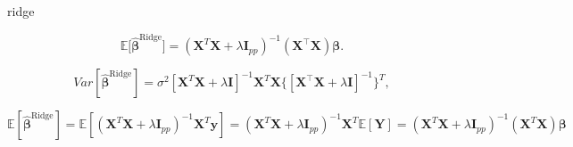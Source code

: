 \documentclass[twoside,11pt]{report}
\begin{document}
ridge


$$
\mathbb{E} \big[ \hat{\mathbf{\beta}}^{\mathrm{Ridge}} \big]=(\mathbf{X}^{T} \mathbf{X} + \lambda \mathbf{I}_{pp})^{-1} (\mathbf{X}^{\top} \mathbf{X})\mathbf{\beta}.
$$


$$
{Var}[\hat{\mathbf{\beta}}^{\mathrm{Ridge}}]=\sigma^2[  \mathbf{X}^{T} \mathbf{X} + \lambda \mathbf{I} ]^{-1}  \mathbf{X}^{T}\mathbf{X} \{ [  \mathbf{X}^{\top} \mathbf{X} + \lambda \mathbf{I} ]^{-1}\}^{T},
$$


$$
\mathbb{E}[\mathbf{\hat{\beta}}^{\mathrm{Ridge}}] = \mathbb{E}\left[ \left(\mathbf{X}^T\mathbf{X}+\lambda\mathbf{I}_{pp}\right)^{-1}\mathbf{X}^T\mathbf{y}\right]=\left(\mathbf{X}^T\mathbf{X}+\lambda\mathbf{I}_{pp}\right)^{-1}\mathbf{X}^T \mathbb{E}[ \mathbf{Y}]=\left(\mathbf{X}^T\mathbf{X}+\lambda\mathbf{I}_{pp}\right)^{-1}\left(\mathbf{X}^T  \mathbf{X}\right)\mathbf{\beta}
$$
\end{document}
